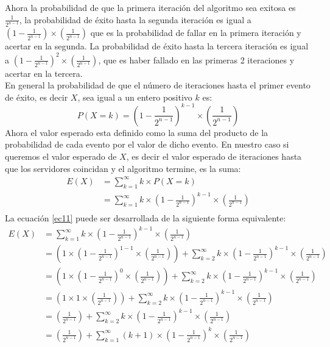 \documentclass[12pt]{article}
\begin{document}
Ahora la probabilidad de que la primera iteración del algoritmo sea exitosa es $\frac{1}{2^{n-1}}$, la probabilidad de éxito hasta la segunda iteración es igual a $(1 - \frac{1}{2^{n-1}})\times(\frac{1}{2^{n-1}})$ que es la probabilidad de fallar en la primera iteración y acertar en la segunda. La probabilidad de éxito hasta la tercera iteración es igual a $(1 - \frac{1}{2^{n-1}})^2\times(\frac{1}{2^{n-1}})$, que es haber fallado en las primeras 2 iteraciones y acertar en la tercera.\\
En general la probabilidad de que el número de iteraciones hasta el primer evento de éxito, es decir $X$, sea igual a un entero positivo $k$ es:\\
\begin{equation}
	P(X=k)= (1 - \frac{1}{2^{n-1}})^{k-1} \times (\frac{1}{2^{n-1}})
\end{equation}
 Ahora el valor esperado esta definido como la suma del producto de la probabilidad de cada evento por el valor de dicho evento. En nuestro caso si queremos el valor esperado de $X$, es decir el valor esperado de iteraciones hasta que los servidores coincidan y el algoritmo termine, es la suma:
 \begin{equation}\label{ec11}
 \begin{split}
 E(X) &= \sum_{k=1}^{\infty}{k \times P(X=k)} \\
 &= \sum_{k=1}^{\infty}{k \times (1 - \frac{1}{2^{n-1}})^{k-1} \times (\frac{1}{2^{n-1}})}\\
 \end{split}
 \end{equation}
 La ecuación \ref{ec11} puede ser desarrollada de la siguiente forma equivalente:
 \begin{equation}\label{ec12}
 \begin{split}
 E(X) &= \sum_{k=1}^{\infty}{k \times (1 - \frac{1}{2^{n-1}})^{k-1} \times (\frac{1}{2^{n-1}})}\\
 &= (1 \times (1 - \frac{1}{2^{n-1}})^{1-1} \times (\frac{1}{2^{n-1}})) + \sum_{k=2}^{\infty}{k \times (1 - \frac{1}{2^{n-1}})^{k-1} \times (\frac{1}{2^{n-1}})}\\
 &= (1 \times (1 - \frac{1}{2^{n-1}})^{0} \times (\frac{1}{2^{n-1}})) + \sum_{k=2}^{\infty}{k \times (1 - \frac{1}{2^{n-1}})^{k-1} \times (\frac{1}{2^{n-1}})}\\
 &= (1 \times 1 \times (\frac{1}{2^{n-1}})) + \sum_{k=2}^{\infty}{k \times (1 - \frac{1}{2^{n-1}})^{k-1} \times (\frac{1}{2^{n-1}})}\\
 &= (\frac{1}{2^{n-1}}) + \sum_{k=2}^{\infty}{k \times (1 - \frac{1}{2^{n-1}})^{k-1} \times (\frac{1}{2^{n-1}})}\\
 &= (\frac{1}{2^{n-1}}) + \sum_{k=1}^{\infty}{(k+1) \times (1 - \frac{1}{2^{n-1}})^{k} \times (\frac{1}{2^{n-1}})}
 \end{split}
 \end{equation}
\end{document}
